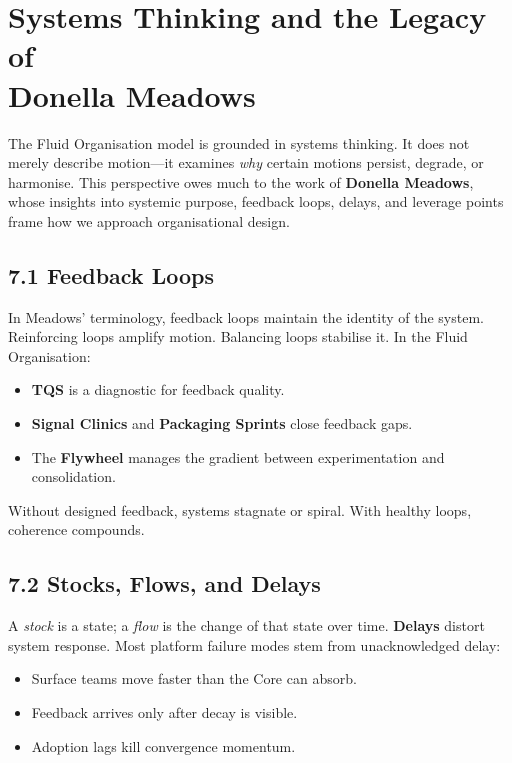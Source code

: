 \documentclass[12pt]{article}
\begin{document}
\section{Systems Thinking and the Legacy of\\Donella Meadows}

The Fluid Organisation model is grounded in systems thinking. It does not merely describe motion—it examines \textit{why} certain motions persist, degrade, or harmonise. This perspective owes much to the work of \textbf{Donella Meadows}, whose insights into systemic purpose, feedback loops, delays, and leverage points frame how we approach organisational design.

\subsection*{7.1 Feedback Loops}

In Meadows’ terminology, feedback loops maintain the identity of the system. Reinforcing loops amplify motion. Balancing loops stabilise it. In the Fluid Organisation:
\begin{itemize}
    \item \textbf{TQS} is a diagnostic for feedback quality.
    \item \textbf{Signal Clinics} and \textbf{Packaging Sprints} close feedback gaps.
    \item The \textbf{Flywheel} manages the gradient between experimentation and consolidation.
\end{itemize}

Without designed feedback, systems stagnate or spiral. With healthy loops, coherence compounds.

\subsection*{7.2 Stocks, Flows, and Delays}

A \textit{stock} is a state; a \textit{flow} is the change of that state over time. \textbf{Delays} distort system response. Most platform failure modes stem from unacknowledged delay:
\begin{itemize}
    \item Surface teams move faster than the Core can absorb.
    \item Feedback arrives only after decay is visible.
    \item Adoption lags kill convergence momentum.
\end{itemize}
\end{document}
